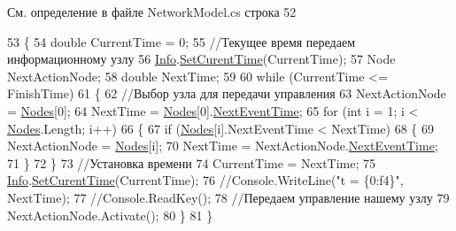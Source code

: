 См. определение в файле Network\+Model.\+cs строка 52


\begin{DoxyCode}
53         \{
54             \textcolor{keywordtype}{double} CurrentTime = 0;
55             \textcolor{comment}{//Текущее время передаем информационному узлу}
56             \hyperlink{class_network_simulator_1_1_network_model_ad855627388c67befd2c4c736a87fa84d}{Info}.\hyperlink{class_network_simulator_1_1_info_node_a99e3644d53d9feba5a9381f3a9912eec}{SetCurentTime}(CurrentTime);
57             Node NextActionNode;
58             \textcolor{keywordtype}{double} NextTime;
59 
60             \textcolor{keywordflow}{while} (CurrentTime <= FinishTime)
61             \{
62                 \textcolor{comment}{//Выбор узла для передачи управления }
63                 NextActionNode = \hyperlink{class_network_simulator_1_1_network_model_a822a8596ab343f9a22006035fdaf4b6f}{Nodes}[0];
64                 NextTime = \hyperlink{class_network_simulator_1_1_network_model_a822a8596ab343f9a22006035fdaf4b6f}{Nodes}[0].\hyperlink{class_network_simulator_1_1_node_ab3ae85d27d7e9056751bd826f1a3432b}{NextEventTime};
65                 \textcolor{keywordflow}{for} (\textcolor{keywordtype}{int} i = 1; i < \hyperlink{class_network_simulator_1_1_network_model_a822a8596ab343f9a22006035fdaf4b6f}{Nodes}.Length; i++)
66                 \{
67                     \textcolor{keywordflow}{if} (\hyperlink{class_network_simulator_1_1_network_model_a822a8596ab343f9a22006035fdaf4b6f}{Nodes}[i].NextEventTime < NextTime)
68                     \{
69                         NextActionNode = \hyperlink{class_network_simulator_1_1_network_model_a822a8596ab343f9a22006035fdaf4b6f}{Nodes}[i];
70                         NextTime = NextActionNode.\hyperlink{class_network_simulator_1_1_node_ab3ae85d27d7e9056751bd826f1a3432b}{NextEventTime};
71                     \}
72                 \}
73                 \textcolor{comment}{//Установка времени}
74                 CurrentTime = NextTime;
75                 \hyperlink{class_network_simulator_1_1_network_model_ad855627388c67befd2c4c736a87fa84d}{Info}.\hyperlink{class_network_simulator_1_1_info_node_a99e3644d53d9feba5a9381f3a9912eec}{SetCurentTime}(CurrentTime);
76                 \textcolor{comment}{//Console.WriteLine("t = \{0:f4\}", NextTime);}
77                 \textcolor{comment}{//Console.ReadKey();}
78                 \textcolor{comment}{//Передаем управление нашему узлу}
79                 NextActionNode.Activate();
80             \}
81         \}
\end{DoxyCode}


